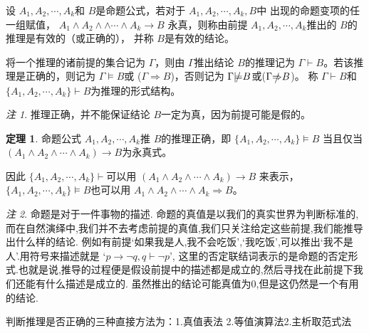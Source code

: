 \documentclass[a4paper,11pt]{article}%
\theoremstyle{remark}
\newtheorem*{remark}{注}
\theoremstyle{remark}
\theoremstyle{definition}
\newtheorem{theorem}{定理}[section]
\theoremstyle{definition}
\theoremstyle{plain}
\begin{document}
设 $A_1,A_2,\cdots,A_k$和 $B$是命题公式，若对于 $A_1,A_2,\cdots,A_k,B$中
出现的命题变项的任一组赋值， $A_1\land A_2\land\land\cdots\land A_k\rightarrow B$
永真，则称由前提 $A_1,A_2,\cdots,A_k$推出的 $B$的推理是有效的（或正确的），
并称 $B$是有效的结论。

将一个推理的诸前提的集合记为 $\Gamma$，则由 $\Gamma$推出结论 $B$的推理记为
$\Gamma\vdash B$。若该推理是正确的，则记为 $\Gamma\models B$或 ($\Gamma 
\Rightarrow B$)，否则记为 $\Gamma\slashed{\models}B$或($\Gamma\slashed{\Rightarrow}B$)。
称 $\Gamma\vdash B$和 $\{A_1,A_2,\cdots,A_k\}\vdash B$为推理的形式结构。
\begin{remark}
    推理正确，并不能保证结论 $B$一定为真，因为前提可能是假的。
\end{remark}
\begin{theorem}
    命题公式 $A_1,A_2,\cdots,A_k$推 $B$的推理正确，即 $\{A_1,A_2,\cdots,A_k\}\models B$
    当且仅当 $(A_1\land A_2\land \cdots\land A_k)\rightarrow B$为永真式。
\end{theorem}
因此 $\{A_1,A_2,\cdots,A_k\}\vdash$可以用 $(A_1\land A_2\land\cdots\land A_k)\rightarrow B$
来表示， $\{A_1,A_2,\cdots,A_k\}\models B$也可以用 $A_1\land A_2\land\cdots\land A_k\Rightarrow B$。
\begin{remark}
    命题是对于一件事物的描述.
    命题的真值是以我们的真实世界为判断标准的,而在自然演绎中,我们并不去考虑前提的真值,我们只关注给定这些前提,我们能推导出什么样的结论.
    例如有前提`如果我是人,我不会吃饭',`我吃饭',可以推出`我不是人'.用符号来描述就是 `$p\rightarrow \lnot q,q\vdash \lnot p$',
    这里的否定联结词表示的是命题的否定形式.也就是说,推导的过程便是假设前提中的描述都是成立的,然后寻找在此前提下我们还能有什么描述是成立的.
    虽然推出的结论可能真值为0,但是这仍然是一个有用的结论.
\end{remark}
判断推理是否正确的三种直接方法为：1.真值表法 2.等值演算法2.主析取范式法
\end{document}
